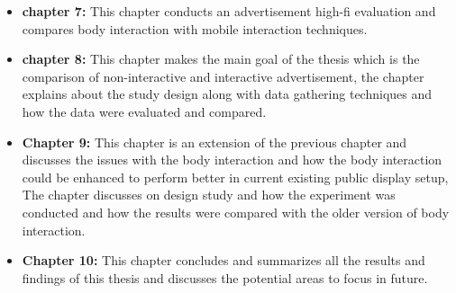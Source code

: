 \begin{itemize}
\item \textbf{chapter 7:}
This chapter conducts an advertisement high-fi evaluation and compares body interaction with mobile interaction techniques.


\item \textbf{chapter 8:}
This chapter makes the main goal of the thesis which is the comparison of non-interactive and interactive advertisement, the chapter explains about the study design along with data gathering techniques and how the data were evaluated and compared.


\item \textbf{Chapter 9:}
This chapter is an extension of the previous chapter and discusses the issues with the body interaction and how the body interaction could be enhanced to perform better in current existing public display setup, The chapter discusses on design study and how the experiment was conducted and how the results were compared with the older version of body interaction. 


\item \textbf{Chapter 10:}
This chapter concludes and summarizes all the results and findings of this thesis and discusses the potential areas to focus in future. 

\end{itemize}

